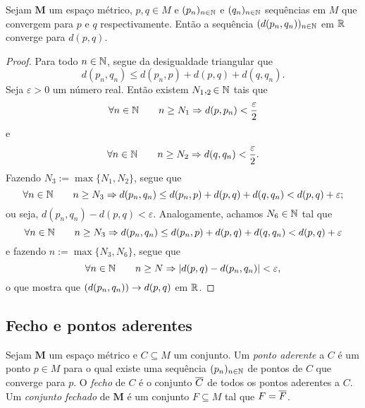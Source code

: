 \begin{proposition}
Sejam $\bm M$ um espaço métrico, $p,q \in M$ e $(p_n)_{n \in \mathbb{N}}$ e $(q_n)_{n \in \mathbb{N}}$ sequências em $M$ que convergem para $p$ e $q$ respectivamente. Então a sequência $(d(p_n,q_n))_{n \in \mathbb{N}}$ em $\mathbb{R}$ converge para $d(p,q)$.
\end{proposition}
\begin{proof}
	Para todo $n \in \mathbb{N}$, segue da desigualdade triangular que
	\begin{equation*}
	d(p_n,q_n) \leq d(p_n,p) + d(p,q) + d(q,q_n).
	\end{equation*}
Seja $\varepsilon > 0$ um número real. Então existem $N_1,_2 \in \mathbb{N}$ tais que
	\begin{equation*}
	\forall n \in \mathbb{N} \qquad n \geq N_1 \Rightarrow d(p,p_n) < \frac{\varepsilon}{2}
	\end{equation*}
e
	\begin{equation*}
	\forall n \in \mathbb{N} \qquad n \geq N_2 \Rightarrow d(q,q_n) < \frac{\varepsilon}{2}.
	\end{equation*}
Fazendo $N_3 := \max\{N_1,N_2\}$, segue que
	\begin{equation*}
	\forall n \in \mathbb{N} \qquad n \geq N_3 \Rightarrow d(p_n,q_n) \leq d(p_n,p) + d(p,q) + d(q,q_n) < d(p,q) + \varepsilon;
	\end{equation*}
ou seja, $d(p_n,q_n) - d(p,q) < \varepsilon$. Analogamente, achamos $N_6 \in \mathbb{N}$ tal que
	\begin{equation*}
	\forall n \in \mathbb{N} \qquad n \geq N_3 \Rightarrow d(p_n,q_n) \leq d(p_n,p) + d(p,q) + d(q,q_n) < d(p,q) + \varepsilon
	\end{equation*}
e fazendo $n := \max\{N_3,N_6\}$, segue que
	\begin{equation*}
	\forall n \in \mathbb{N} \qquad n \geq N \Rightarrow |d(p,q) - d(p_n,q_n)| < \varepsilon,
	\end{equation*}
o que mostra que $(d(p_n,q_n)) \rightarrow d(p,q)$ em $\mathbb{R}$.
	
\end{proof}

\subsection{Fecho e pontos aderentes}

\begin{definition}
Sejam $\bm M$ um espaço métrico e $C \subseteq M$ um conjunto. Um \emph{ponto aderente} a $C$ é um ponto $p \in M$ para o qual existe uma sequência $(p_n)_{n \in \mathbb{N}}$ de pontos de $C$ que converge para $p$. O \emph{fecho} de $C$ é o conjunto $\overline{C}$ de todos os pontos aderentes a $C$. Um \emph{conjunto fechado} de $\bm M$ é um conjunto $F \subseteq M$ tal que $F = \overline{F}$.
\end{definition}

